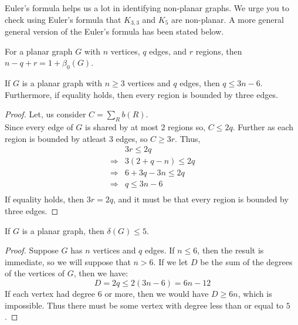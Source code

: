 \documentclass[../basic_graph_theory.tex]{subfiles}
\begin{document}
Euler's formula helps us a lot in identifying non-planar graphs. We urge you to check using Euler's formula that $K_{3,3}$ and $K_5$ are non-planar. A more general general version of the Euler's formula has been stated below.

\begin{Thm}{}{}
    For a planar graph $G$ with $n$ vertices, $q$ edges, and $r$ regions, then $n-q+r=1+\beta_{0}(G)$.
\end{Thm}

\begin{Thm}{}{}
    If $G$ is a planar graph with $n \ge 3$ vertices and $q$ edges, then $q \le 3n - 6$. Furthermore, if equality holds, then every region is bounded by three edges.
\end{Thm}
\begin{proof}
    Let, us consider $C=\sum_{R}b(R)$.\\
    Since every edge of $G$ is shared by at most $2$ regions so, $C \le 2q$. Further as each region is bounded by atleast $3$ edges, so $C \ge 3r$. Thus,\\
    \begin{align*}
                        & 3r \le 2q       \\
        \Longrightarrow & 3(2+q-n) \le 2q \\
        \Longrightarrow & 6+3q-3n \le 2q  \\
        \Longrightarrow & q \le 3n-6      \\
    \end{align*}
    If equality holds, then $3r = 2q$, and it must be that every region is bounded by three edges.
\end{proof}

\begin{Thm}{}{}
    If $G$ is a planar graph, then $\delta(G) \le 5$.
\end{Thm}
\begin{proof}
    Suppose $G$ has $n$ vertices and $q$ edges. If $n \le 6$, then the result is immediate, so we will suppose that $n > 6$. If we let $D$ be the sum of the degrees of the vertices of $G$, then we have:\\
    \begin{equation*}
        D = 2q \le 2(3n - 6) = 6n - 12
    \end{equation*}
    If each vertex had degree $6$ or more, then we would have $D \ge 6n$, which is impossible. Thus there must be some vertex with degree less than or equal to $5$.
\end{proof}
\end{document}
